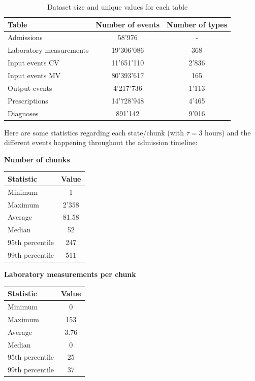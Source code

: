 \begin{table}[H]
 \begin{center}
  \caption{Dataset size and unique values for each table}
  \begin{tabular}{| l | c | c |}
   \hline
   \textbf{Table} & \textbf{Number of events} & \textbf{Number of types} \\ \hline
   Admissions & 58'976 & - \\ \hline
   Laboratory measurements & 19'306'086 & 368 \\ \hline
   Input events CV & 11'651'110 & 2'836 \\ \hline
   Input events MV & 80'393'617 & 165 \\ \hline
   Output events & 4'217'736 & 1'113 \\ \hline
   Prescriptions & 14'728'948 & 4'465 \\ \hline
   Diagnoses & 891'142 & 9'016  \\
   \hline
  \end{tabular}
 \end{center}
\end{table}

Here are some statistics regarding each state/chunk (with $\tau=3\mbox{ hours}$) and the different events happening throughout the admission timeline:

\begin{multicols}{2}
 \centering
 \textbf{Number of chunks}
 \begin{center}
  \begin{tabular}{| l | c |}
   \hline
   \textbf{Statistic} & \textbf{Value} \\ \hline
   Minimum & 1 \\ \hline
   Maximum & 2'358 \\ \hline
   Average & 81.58 \\ \hline
   Median & 52 \\ \hline
   95th percentile & 247 \\ \hline
   99th percentile & 511 \\
   \hline
  \end{tabular}
 \end{center}\columnbreak
 \textbf{Laboratory measurements per chunk}
 \begin{center}
  \begin{tabular}{| l | c |}
   \hline
   \textbf{Statistic} & \textbf{Value} \\ \hline
   Minimum & 0 \\ \hline
   Maximum & 153 \\ \hline
   Average & 3.76 \\ \hline
   Median & 0 \\ \hline
   95th percentile & 25 \\ \hline
   99th percentile & 37 \\
   \hline
  \end{tabular}
 \end{center}
\end{multicols}

